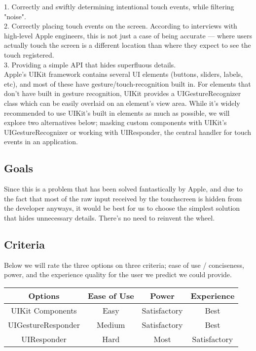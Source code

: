 \documentclass[letterpaper,10pt,titlepage]{article}
\begin{document}
1. Correctly and swiftly determining intentional touch events, while filtering "noise".\\
2. Correctly placing touch events on the screen. According to interviews with high-level Apple engineers\cite{touchpara1}, this is not just a case of being accurate — where users actually touch the screen is a different location than where they expect to see the touch registered.\\
3. Providing a simple API that hides superfluous details.\\

Apple's UIKit framework contains several UI elements (buttons, sliders, labels, etc), and most of these have gesture/touch-recognition built in. For elements that don't have built in gesture recognition, UIKit provides a UIGestureRecognizer class which can be easily overlaid on an element's view area.
While it's widely recommended to use UIKit's built in elements as much as possible, we will explore two alternatives below; masking custom components with UIKit's UIGestureRecognizer or working with UIResponder, the central handler for touch events in an application.

\subsection{Goals}
Since this is a problem that has been solved fantastically by Apple, and due to the fact that most of the raw input received by the touchscreen is hidden from the developer anyways, it would be best for us to choose the simplest solution that hides unnecessary details. There's no need to reinvent the wheel.

\subsection{Criteria}
Below we will rate the three options on three criteria; ease of use / conciseness, power, and the experience quality for the user we predict we could provide.
\begin{center}
\begin{tabular}{ |c|c|c|c| }
 \hline
 Options & Ease of Use & Power & Experience \\ \hline
 UIKit Components & Easy & Satisfactory & Best \\ \hline
 UIGestureResponder & Medium & Satisfactory & Best \\ \hline
 UIResponder & Hard & Most & Satisfactory \\
 \hline
\end{tabular}
\end{center}
\end{document}

